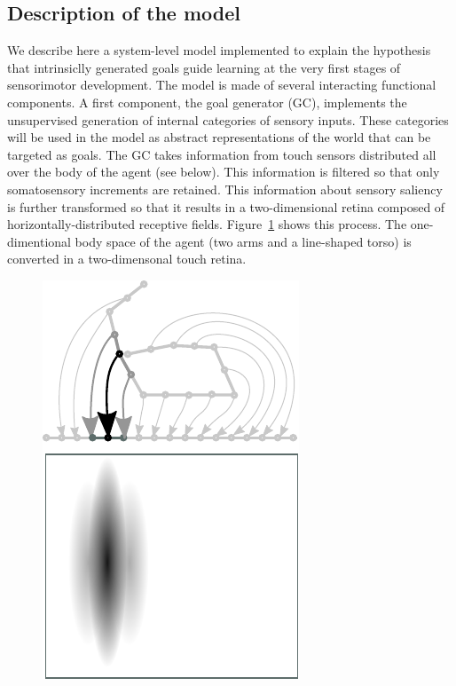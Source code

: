 \subsection{Description of the model}
\label{sec:Description}


We describe here a system-level model implemented to explain the hypothesis that intrinsiclly generated goals guide learning at the very first stages of sensorimotor development. 
%
The model is made of several interacting functional components.  
%
A first component, the goal generator (GC), implements the unsupervised generation of internal categories of sensory inputs. These categories will be used in the model as abstract representations of the world that can be targeted as goals. The GC takes information from touch sensors distributed all over the body of the agent (see below). This information is filtered so that only somatosensory increments are retained. This information about sensory saliency is further transformed so that it results in a two-dimensional retina composed of horizontally-distributed receptive fields. Figure~\ref{fig:sensory-input} shows this process. The one-dimentional body space of the agent (two arms and a line-shaped torso) is converted in a two-dimensonal touch retina. 

\begin{figure}[htp]
\centering
\includegraphics[scale=1.0]{sensoryinput}
\caption{}
\label{fig:sensory-input}
\end{figure}



